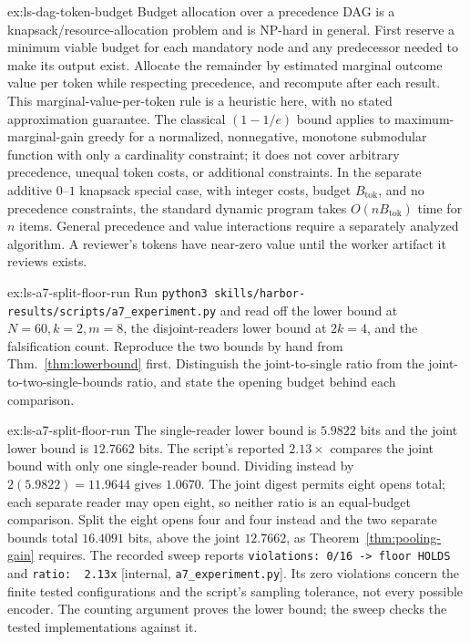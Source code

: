 \documentclass[11pt,a4paper]{article}
\theoremstyle{definition}
\theoremstyle{plain}
\begin{document}
\begin{pdsolution}{ex:ls-dag-token-budget}
Budget allocation over a precedence DAG is a knapsack/resource-allocation problem and is NP-hard in general. First reserve a minimum viable budget for each mandatory node and any predecessor needed to make its output exist. Allocate the remainder by estimated marginal outcome value per token while respecting precedence, and recompute after each result. This marginal-value-per-token rule is a heuristic here, with no stated approximation guarantee. The classical $(1-1/e)$ bound applies to maximum-marginal-gain greedy for a normalized, nonnegative, monotone submodular function with only a cardinality constraint; it does not cover arbitrary precedence, unequal token costs, or additional constraints. In the separate additive $0$--$1$ knapsack special case, with integer costs, budget $B_{\mathrm{tok}}$, and no precedence constraints, the standard dynamic program takes $O(nB_{\mathrm{tok}})$ time for $n$ items. General precedence and value interactions require a separately analyzed algorithm. A reviewer's tokens have near-zero value until the worker artifact it reviews exists.
\end{pdsolution}
\begin{pdexercise}[kind=Trace,rating=2]{ex:ls-a7-split-floor-run}
Run \texttt{python3 skills/harbor-results/scripts/a7\_experiment.py} and read off the
lower bound at $N{=}60,k{=}2,m{=}8$, the disjoint-readers lower bound at $2k{=}4$, and the
falsification count. Reproduce the two bounds by hand from Thm.~\ref{thm:lowerbound}
first. Distinguish the joint-to-single ratio from the joint-to-two-single-bounds
ratio, and state the opening budget behind each comparison.
\end{pdexercise}
\begin{pdsolution}{ex:ls-a7-split-floor-run}
The single-reader lower bound is $5.9822$ bits and the joint lower bound is $12.7662$ bits.
The script's reported $2.13\times$ compares the joint bound with only one
single-reader bound. Dividing instead by $2(5.9822)=11.9644$ gives $1.0670$.
The joint digest permits eight opens total; each separate reader may open
eight, so neither ratio is an equal-budget comparison. Split the eight opens
four and four instead and the two separate bounds total $16.4091$ bits, above the
joint $12.7662$, as Theorem~\ref{thm:pooling-gain} requires.
The recorded sweep reports \texttt{violations: 0/16 -> floor HOLDS} and
\texttt{ratio:\ \ 2.13x} [internal, \texttt{a7\_experiment.py}]. Its zero
violations concern the finite tested configurations and the script's
sampling tolerance, not every possible encoder. The counting argument
proves the lower bound; the sweep checks the tested implementations against it.
\end{pdsolution}
\end{document}
